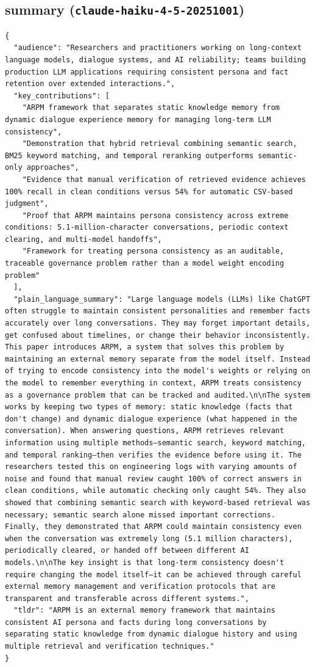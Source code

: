 \documentclass[11pt]{article}
\begin{document}
\subsection*{summary (\texttt{claude-haiku-4-5-20251001})}
\begin{verbatim}
{
  "audience": "Researchers and practitioners working on long-context language models, dialogue systems, and AI reliability; teams building production LLM applications requiring consistent persona and fact retention over extended interactions.",
  "key_contributions": [
    "ARPM framework that separates static knowledge memory from dynamic dialogue experience memory for managing long-term LLM consistency",
    "Demonstration that hybrid retrieval combining semantic search, BM25 keyword matching, and temporal reranking outperforms semantic-only approaches",
    "Evidence that manual verification of retrieved evidence achieves 100% recall in clean conditions versus 54% for automatic CSV-based judgment",
    "Proof that ARPM maintains persona consistency across extreme conditions: 5.1-million-character conversations, periodic context clearing, and multi-model handoffs",
    "Framework for treating persona consistency as an auditable, traceable governance problem rather than a model weight encoding problem"
  ],
  "plain_language_summary": "Large language models (LLMs) like ChatGPT often struggle to maintain consistent personalities and remember facts accurately over long conversations. They may forget important details, get confused about timelines, or change their behavior inconsistently. This paper introduces ARPM, a system that solves this problem by maintaining an external memory separate from the model itself. Instead of trying to encode consistency into the model's weights or relying on the model to remember everything in context, ARPM treats consistency as a governance problem that can be tracked and audited.\n\nThe system works by keeping two types of memory: static knowledge (facts that don't change) and dynamic dialogue experience (what happened in the conversation). When answering questions, ARPM retrieves relevant information using multiple methods—semantic search, keyword matching, and temporal ranking—then verifies the evidence before using it. The researchers tested this on engineering logs with varying amounts of noise and found that manual review caught 100% of correct answers in clean conditions, while automatic checking only caught 54%. They also showed that combining semantic search with keyword-based retrieval was necessary; semantic search alone missed important corrections. Finally, they demonstrated that ARPM could maintain consistency even when the conversation was extremely long (5.1 million characters), periodically cleared, or handed off between different AI models.\n\nThe key insight is that long-term consistency doesn't require changing the model itself—it can be achieved through careful external memory management and verification protocols that are transparent and transferable across different systems.",
  "tldr": "ARPM is an external memory framework that maintains consistent AI persona and facts during long conversations by separating static knowledge from dynamic dialogue history and using multiple retrieval and verification techniques."
}
\end{verbatim}
\end{document}
